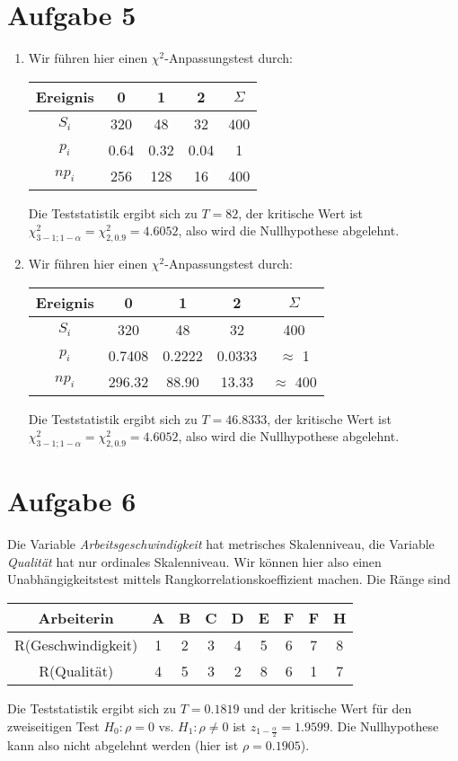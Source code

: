 \documentclass{article}
\begin{document}
	\section*{Aufgabe 5}
	\begin{enumerate}[label=(\alph*)]
		\item Wir führen hier einen $\chi^2$-Anpassungstest durch:
		\begin{center}
			\begin{tabular}{c|ccc|c}
				Ereignis & 0 & 1 & 2 & $\Sigma$ \\
				\hline
				$S_i$ & 320 & 48 & 32 & 400 \\
				$p_i$ & 0.64 & 0.32 & 0.04 & 1 \\
				$np_i$ & 256 & 128 & 16 & 400
			\end{tabular}
		\end{center}
		Die Teststatistik ergibt sich zu $T=82$, der kritische Wert ist $\chi^2_{3-1;1-\alpha}=\chi^2_{2,0.9}=4.6052$, also wird die Nullhypothese abgelehnt.
		\item Wir führen hier einen $\chi^2$-Anpassungstest durch:
		\begin{center}
			\begin{tabular}{c|ccc|c}
				Ereignis & 0 & 1 & 2 & $\Sigma$ \\
				\hline
				$S_i$ & 320 & 48 & 32 & 400 \\
				$p_i$ & 0.7408 & 0.2222 & 0.0333 & $\approx$ 1 \\
				$np_i$ & 296.32 & 88.90 & 13.33 & $\approx$ 400
			\end{tabular}
		\end{center}
		Die Teststatistik ergibt sich zu $T=46.8333$, der kritische Wert ist $\chi^2_{3-1;1-\alpha}=\chi^2_{2,0.9}=4.6052$, also wird die Nullhypothese abgelehnt.
	\end{enumerate}

	\section*{Aufgabe 6}
	Die Variable \textit{Arbeitsgeschwindigkeit} hat metrisches Skalenniveau, die Variable \textit{Qualität} hat nur ordinales Skalenniveau. Wir können hier also einen Unabhängigkeitstest mittels Rangkorrelationskoeffizient machen. Die Ränge sind
	\begin{center}
		\begin{tabular}{c|cccccccc}
			Arbeiterin & A & B & C & D & E & F & F & H \\
			\hline
			R(Geschwindigkeit) & 1 & 2 & 3 & 4 & 5 & 6 & 7 & 8 \\
			R(Qualität) & 4 & 5 & 3 & 2 & 8 & 6 & 1 & 7
		\end{tabular}
	\end{center}
	Die Teststatistik ergibt sich zu $T=0.1819$ und der kritische Wert für den zweiseitigen Test $H_0: \rho=0$ vs. $H_1: \rho\neq 0$ ist $z_{1-\frac{\alpha}{2}}=1.9599$. Die Nullhypothese kann also nicht abgelehnt werden (hier ist $\rho = 0.1905$).
	
\end{document}
